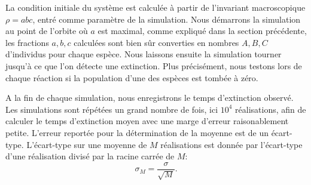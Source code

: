 \documentclass[openany,a4paper,12pt]{article}
\begin{document}
\par La condition initiale du système est calculée à partir de l'invariant macroscopique $\rho=abc$, entré comme paramètre de la simulation. Nous démarrons la simulation au point de l'orbite où $a$ est maximal, comme expliqué dans la section précédente, les fractions $a,b,c$ calculées sont bien sûr converties en nombres $A,B,C$ d'individus pour chaque espèce. Nous laissons ensuite la simulation tourner jusqu'à ce que l'on détecte une extinction. Plus précisément, nous testons lors de chaque réaction si la population d'une des espèces est tombée à zéro.

\par A la fin de chaque simulation, nous enregistrons le temps d'extinction observé. Les simulations sont répétées un grand nombre de fois, ici $10^4$ réalisations, afin de calculer le temps d'extinction moyen avec une marge d'erreur raisonablement petite. L'erreur reportée pour la détermination de la moyenne est de un écart-type. L'écart-type sur une moyenne de $M$ réalisations est donnée par l'écart-type d'une réalisation divisé par la racine carrée de $M$:
%
\begin{equation}\label{gillespie_err_moyenne}
	\sigma_M = \frac{\sigma}{\sqrt{M}}.
\end{equation}
%


		
\printbibliography
\end{document}
